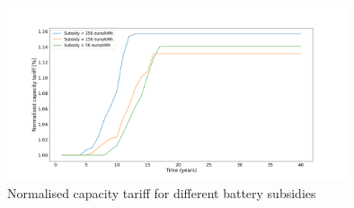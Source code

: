 \noindent
\newline
\begin{figure}[h!]
    \centering
    \includegraphics[width=10cm]{AppendixA/CapTarsubs.png}
    \caption{Normalised capacity tariff for different battery subsidies}
    \label{fig:}
\end{figure}
\newline

